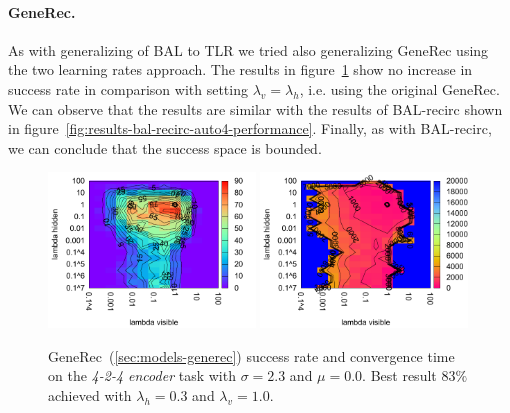 \paragraph{GeneRec.} 
As with generalizing of BAL to TLR we tried also generalizing GeneRec using the two learning rates approach. The results in figure~\ref{fig:results-generec-auto4-performance} show no increase in success rate in comparison with setting $\lambda_v = \lambda_h$, i.e. using the original GeneRec. We can observe that the results are similar with the results of BAL-recirc shown in figure~\ref{fig:results-bal-recirc-auto4-performance}. Finally, as with BAL-recirc, we can conclude that the success space is bounded.  
\begin{figure}[H]
  \centering
  \includegraphics[width=0.49\textwidth]{img/generec-auto4-success.pdf}   
  \includegraphics[width=0.49\textwidth]{img/generec-auto4-epoch.pdf}     
  \caption{GeneRec~(\ref{sec:models-generec}) success rate and convergence time on the \emph{4-2-4 encoder} task with $\sigma = 2.3$ and $\mu = 0.0$. Best result $83\%$ achieved with $\lambda_h = 0.3$ and $\lambda_v=1.0$.}
  \label{fig:results-generec-auto4-performance}
\end{figure}



